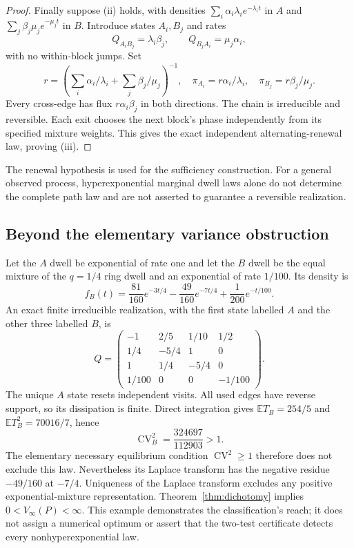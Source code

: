 \documentclass[11pt,a4paper]{article}
\newcommand{\E}{\mathbb E}
\begin{document}
\begin{proof}
Finally suppose (ii) holds, with densities $\sum_i\alpha_i\lambda_i e^{-\lambda_it}$ in $A$ and $\sum_j\beta_j\mu_j e^{-\mu_jt}$ in $B$. Introduce states $A_i,B_j$ and rates
\[
 Q_{A_iB_j}=\lambda_i\beta_j,\qquad
 Q_{B_jA_i}=\mu_j\alpha_i,
\]
with no within-block jumps. Set
\[
 r=\left(\sum_i\alpha_i/\lambda_i+\sum_j\beta_j/\mu_j\right)^{-1},
 \quad \pi_{A_i}=r\alpha_i/\lambda_i,
 \quad \pi_{B_j}=r\beta_j/\mu_j.
\]
Every cross-edge has flux $r\alpha_i\beta_j$ in both directions. The chain is irreducible and reversible. Each exit chooses the next block's phase independently from its specified mixture weights. This gives the exact independent alternating-renewal law, proving (iii).
\end{proof}

The renewal hypothesis is used for the sufficiency construction. For a general observed process, hyperexponential marginal dwell laws alone do not determine the complete path law and are not asserted to guarantee a reversible realization.

\subsection{Beyond the elementary variance obstruction}\label{sec:beyondvariance}
Let the $A$ dwell be exponential of rate one and let the $B$ dwell be the equal mixture of the $q=1/4$ ring dwell and an exponential of rate $1/100$. Its density is
\[
f_B(t)=\frac{81}{160}e^{-3t/4}-\frac{49}{160}e^{-7t/4}+\frac1{200}e^{-t/100}.
\]
An exact finite irreducible realization, with the first state labelled $A$ and the other three labelled $B$, is
\[
Q=\begin{pmatrix}
-1&2/5&1/10&1/2\\
1/4&-5/4&1&0\\
1&1/4&-5/4&0\\
1/100&0&0&-1/100
\end{pmatrix}.
\]
The unique $A$ state resets independent visits. All used edges have reverse support, so its dissipation is finite. Direct integration gives $\E T_B=254/5$ and $\E T_B^2=70016/7$, hence
\[
\operatorname{CV}_B^2=\frac{324697}{112903}>1.
\]
The elementary necessary equilibrium condition $\operatorname{CV}^2\geq1$ therefore does not exclude this law. Nevertheless its Laplace transform has the negative residue $-49/160$ at $-7/4$. Uniqueness of the Laplace transform excludes any positive exponential-mixture representation. Theorem~\ref{thm:dichotomy} implies $0<V_\infty(P)<\infty$. This example demonstrates the classification's reach; it does not assign a numerical optimum or assert that the two-test certificate detects every nonhyperexponential law.
\end{document}
